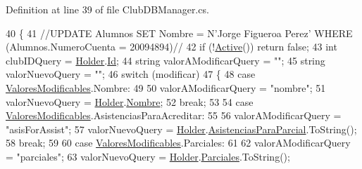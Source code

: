Definition at line 39 of file Club\-D\-B\-Manager.\-cs.


\begin{DoxyCode}
40         \{
41             \textcolor{comment}{//UPDATE Alumnos SET Nombre = N'Jorge Figueroa Perez' WHERE (Alumnos.NumeroCuenta = 20094894)//}
42             \textcolor{keywordflow}{if} (!\hyperlink{class_asistencias__wpf_1_1_club_d_b_manager_a8d30f338a090ebf66923be98db072831}{Active}()) \textcolor{keywordflow}{return} \textcolor{keyword}{false};
43             \textcolor{keywordtype}{int} clubIDQuery = \hyperlink{class_asistencias__wpf_1_1_club_d_b_manager_ab1863b4e35d108dd383a66ae76f8f0a8}{Holder}.\hyperlink{class_asistencias__wpf_1_1_club_a25ec9c585f6874004dc690ea2641ab0d}{Id};
44             \textcolor{keywordtype}{string} valorAModificarQuery = \textcolor{stringliteral}{""};
45             \textcolor{keywordtype}{string} valorNuevoQuery = \textcolor{stringliteral}{""};
46             \textcolor{keywordflow}{switch} (modificar)
47             \{
48                 \textcolor{keywordflow}{case} \hyperlink{class_asistencias__wpf_1_1_club_d_b_manager_ae652da6f39c8eba7b4a94503cadffed3}{ValoresModificables}.Nombre:
49 
50                     valorAModificarQuery = \textcolor{stringliteral}{"nombre"};
51                     valorNuevoQuery = \hyperlink{class_asistencias__wpf_1_1_club_d_b_manager_ab1863b4e35d108dd383a66ae76f8f0a8}{Holder}.\hyperlink{class_asistencias__wpf_1_1_club_a0da21bbffe8ac3d877a51c03899bf8c2}{Nombre};
52                     \textcolor{keywordflow}{break};
53 
54                 \textcolor{keywordflow}{case} \hyperlink{class_asistencias__wpf_1_1_club_d_b_manager_ae652da6f39c8eba7b4a94503cadffed3}{ValoresModificables}.AsistenciasParaAcreditar:
55 
56                     valorAModificarQuery = \textcolor{stringliteral}{"asisForAssist"};
57                     valorNuevoQuery = \hyperlink{class_asistencias__wpf_1_1_club_d_b_manager_ab1863b4e35d108dd383a66ae76f8f0a8}{Holder}.\hyperlink{class_asistencias__wpf_1_1_club_a1855a7a63b6465ef490871f93d385a69}{AsistenciasParaParcial}.ToString();
58                     \textcolor{keywordflow}{break};
59 
60                 \textcolor{keywordflow}{case} \hyperlink{class_asistencias__wpf_1_1_club_d_b_manager_ae652da6f39c8eba7b4a94503cadffed3}{ValoresModificables}.Parciales:
61 
62                     valorAModificarQuery = \textcolor{stringliteral}{"parciales"};
63                     valorNuevoQuery = \hyperlink{class_asistencias__wpf_1_1_club_d_b_manager_ab1863b4e35d108dd383a66ae76f8f0a8}{Holder}.\hyperlink{class_asistencias__wpf_1_1_club_a9f825c0495aa564e915d0f1a9e082186}{Parciales}.ToString();

\end{DoxyCode}
